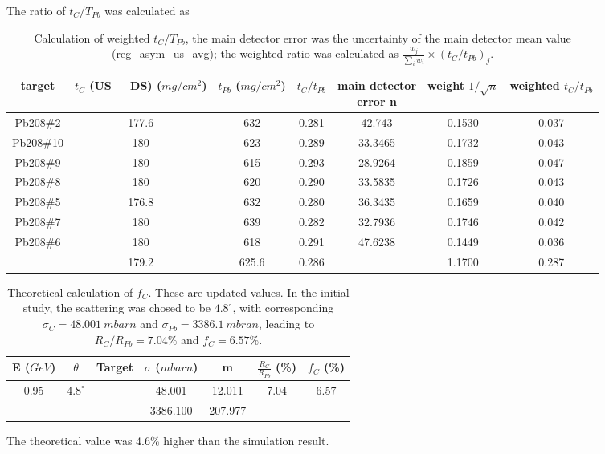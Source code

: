 The ratio of $t_C/T_{Pb}$ was calculated as
\begin{table}[!h]
    \centering
    \begin{tabular}{c | c c c | c c c}
	\hline
	target	& \makecell{$t_C$ (US + DS) \\ ($mg/cm^2$)} & \makecell{$t_{Pb}$ \\ ($mg/cm^2$)}	
	& $t_C/t_{Pb}$  & \makecell{main detector \\ error n} & \makecell{weight \\ $1/\sqrt{n}$}    & \makecell{weighted \\ $t_C/t_{Pb}$} \\
	\hline
	Pb208\#2    & 177.6	& 632	& 0.281	& 42.743    & 0.1530	& 0.037 \\
	Pb208\#10   & 180	& 623	& 0.289	& 33.3465   & 0.1732	& 0.043	\\
	Pb208\#9    & 180	& 615   & 0.293 & 28.9264   & 0.1859   	& 0.047	\\
	Pb208\#8    & 180	& 620   & 0.290 & 33.5835   & 0.1726   	& 0.043	\\
	Pb208\#5    & 176.8	& 632   & 0.280 & 36.3435   & 0.1659   	& 0.040	\\
	Pb208\#7    & 180	& 639   & 0.282 & 32.7936   & 0.1746   	& 0.042	\\
	Pb208\#6    & 180	& 618   & 0.291 & 47.6238   & 0.1449   	& 0.036	\\
	\hline
		    & 179.2	& 625.6	& 0.286	&	    & 1.1700	& \color{red} 0.287 \\
	\hline                                                
    \end{tabular}
    \caption{Calculation of weighted $t_C/T_{Pb}$, the main detector error was
    the uncertainty of the main detector mean value (reg\_asym\_us\_avg); the 
    weighted ratio was calculated as $\frac{w_j}{\sum_i w_i} \times \left( t_C/t_{Pb} \right)_j$.}
    \label{tab:ratio_of_area_density}
\end{table}

\begin{table}[!h]
    \centering
    \begin{tabular}{c c | c c c | c c}
	\hline
	E ($GeV$)   & $\theta$  & Target    & $\sigma$ ($mbarn$)    & m & $\frac{R_C}{R_{Pb}}$ (\%) & $f_C$ (\%)    \\
	\hline
	\multirow{2}{*}{0.95}	& \multirow{2}{*}{$4.8^\circ$}	& 
	      \C    & 48.001	& 12.011    & \multirow{2}{*}{7.04} & \multirow{2}{*}{6.57} \\
	\cline{3-5}
	&   & \Pb   & 3386.100	& 207.977   &	& \\
	\hline
    \end{tabular}
    \caption{Theoretical calculation of $f_C$. These are updated values. In the 
    initial study, the scattering was chosed to be $4.8^\circ$, with corresponding
    $\sigma_C = 48.001\ mbarn$ and $\sigma_{Pb} = 3386.1\ mbran$, leading to
    $R_C/R_{Pb} = 7.04\%$ and $f_C = 6.57\%$.}
\end{table}
The theoretical value was 4.6\% higher than the simulation result.

